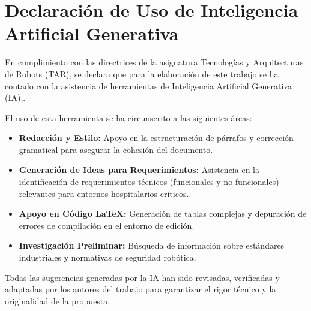 \section*{Declaración de Uso de Inteligencia Artificial Generativa}
En cumplimiento con las directrices de la asignatura Tecnologías y Arquitecturas de Robots (TAR), se declara que para la elaboración de este trabajo se ha contado con la asistencia de herramientas de Inteligencia Artificial Generativa (IA),.

El uso de esta herramienta se ha circunscrito a las siguientes áreas:
\begin{itemize}
    \item \textbf{Redacción y Estilo:} Apoyo en la estructuración de párrafos y corrección gramatical para asegurar la cohesión del documento.
    \item \textbf{Generación de Ideas para Requerimientos:} Asistencia en la identificación de requerimientos técnicos (funcionales y no funcionales) relevantes para entornos hospitalarios críticos.
    \item \textbf{Apoyo en Código LaTeX:} Generación de tablas complejas y depuración de errores de compilación en el entorno de edición.
    \item \textbf{Investigación Preliminar:} Búsqueda de información sobre estándares industriales y normativas de seguridad robótica.
\end{itemize}

Todas las sugerencias generadas por la IA han sido revisadas, verificadas y adaptadas por los autores del trabajo para garantizar el rigor técnico y la originalidad de la propuesta.
